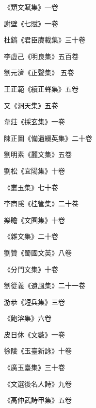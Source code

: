 \begin{pinyinscope}
 《類文賦集》一卷



 謝壁《七賦》一卷



 杜鎬《君臣賡載集》三十卷



 李虛己《明良集》五百卷



 劉元濟《正聲集》
 五卷



 王正範《續正聲集》五卷



 又《洞天集》五卷



 韋莊《採玄集》一卷



 陳正圖《備遺綴英集》二十卷



 劉明素《麗文集》五卷



 劉松《宜陽集》十卷



 《叢玉集》七十卷



 李商隱《桂管集》二十卷



 樂瞻《文囿集》十卷



 《雜文集》二十卷



 劉贊《蜀國文英》八卷



 《分門文集》十卷



 劉從義《遺風集》二十一卷



 游恭《短兵集》三卷



 《鮑溶集》六卷



 皮日休《文藪》一卷



 徐陵《玉臺新詠》十卷



 《廣玉臺集》三十卷



 《文選後名人詩》九卷



 《高仲武詩甲集》五卷




\end{pinyinscope}
